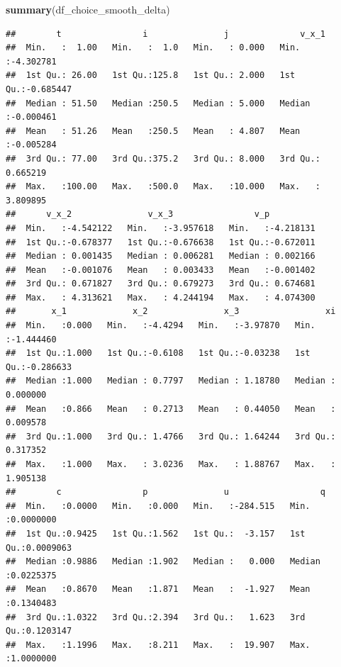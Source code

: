 \documentclass[]{book}
\newenvironment{Shaded}{\begin{snugshade}}{\end{snugshade}}
\newcommand{\KeywordTok}[1]{\textcolor[rgb]{0.13,0.29,0.53}{\textbf{#1}}}
\newcommand{\StringTok}[1]{\textcolor[rgb]{0.31,0.60,0.02}{#1}}
\newcommand{\OperatorTok}[1]{\textcolor[rgb]{0.81,0.36,0.00}{\textbf{#1}}}
\newcommand{\NormalTok}[1]{#1}
\begin{document}
\begin{Shaded}
\begin{Highlighting}[]
\KeywordTok{summary}\NormalTok{(df_choice_smooth_delta)}
\end{Highlighting}
\end{Shaded}

\begin{verbatim}
##        t                i               j              v_x_1          
##  Min.   :  1.00   Min.   :  1.0   Min.   : 0.000   Min.   :-4.302781  
##  1st Qu.: 26.00   1st Qu.:125.8   1st Qu.: 2.000   1st Qu.:-0.685447  
##  Median : 51.50   Median :250.5   Median : 5.000   Median :-0.000461  
##  Mean   : 51.26   Mean   :250.5   Mean   : 4.807   Mean   :-0.005284  
##  3rd Qu.: 77.00   3rd Qu.:375.2   3rd Qu.: 8.000   3rd Qu.: 0.665219  
##  Max.   :100.00   Max.   :500.0   Max.   :10.000   Max.   : 3.809895  
##      v_x_2               v_x_3                v_p           
##  Min.   :-4.542122   Min.   :-3.957618   Min.   :-4.218131  
##  1st Qu.:-0.678377   1st Qu.:-0.676638   1st Qu.:-0.672011  
##  Median : 0.001435   Median : 0.006281   Median : 0.002166  
##  Mean   :-0.001076   Mean   : 0.003433   Mean   :-0.001402  
##  3rd Qu.: 0.671827   3rd Qu.: 0.679273   3rd Qu.: 0.674681  
##  Max.   : 4.313621   Max.   : 4.244194   Max.   : 4.074300  
##       x_1             x_2               x_3                 xi           
##  Min.   :0.000   Min.   :-4.4294   Min.   :-3.97870   Min.   :-1.444460  
##  1st Qu.:1.000   1st Qu.:-0.6108   1st Qu.:-0.03238   1st Qu.:-0.286633  
##  Median :1.000   Median : 0.7797   Median : 1.18780   Median : 0.000000  
##  Mean   :0.866   Mean   : 0.2713   Mean   : 0.44050   Mean   : 0.009578  
##  3rd Qu.:1.000   3rd Qu.: 1.4766   3rd Qu.: 1.64244   3rd Qu.: 0.317352  
##  Max.   :1.000   Max.   : 3.0236   Max.   : 1.88767   Max.   : 1.905138  
##        c                p               u                  q            
##  Min.   :0.0000   Min.   :0.000   Min.   :-284.515   Min.   :0.0000000  
##  1st Qu.:0.9425   1st Qu.:1.562   1st Qu.:  -3.157   1st Qu.:0.0009063  
##  Median :0.9886   Median :1.902   Median :   0.000   Median :0.0225375  
##  Mean   :0.8670   Mean   :1.871   Mean   :  -1.927   Mean   :0.1340483  
##  3rd Qu.:1.0322   3rd Qu.:2.394   3rd Qu.:   1.623   3rd Qu.:0.1203147  
##  Max.   :1.1996   Max.   :8.211   Max.   :  19.907   Max.   :1.0000000
\end{verbatim}

\begin{Shaded}
\end{Shaded}
\end{document}
